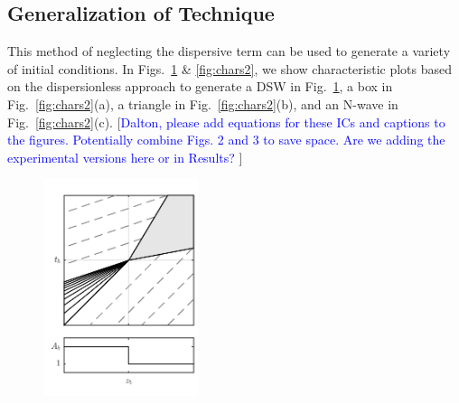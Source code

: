 \documentclass{jfm}
\newcommand{\MM}[1]{[\textcolor{blue}{#1 }]}
\begin{document}
\subsection{Generalization of Technique}\label{sec:Gen-Tech}
    This method of neglecting the dispersive term can be used to generate a variety of initial conditions. In Figs.~\ref{fig:chars1} \& \ref{fig:chars2}, we show characteristic plots based on the dispersionless approach to generate a DSW in Fig.~\ref{fig:chars1}, a box in Fig.~\ref{fig:chars2}(a), a triangle in Fig.~\ref{fig:chars2}(b), and an N-wave in Fig.~\ref{fig:chars2}(c). \MM{Dalton, please add equations for these ICs and captions to the figures. Potentially combine Figs. 2 and 3 to save space. Are we adding the experimental versions here or in Results?}
    \begin{figure}
      \centering
      \includegraphics[height = 2.5in]{Figures/char_dsw.pdf}
      \caption{}
      \label{fig:chars1}
    \end{figure}
\end{document}
